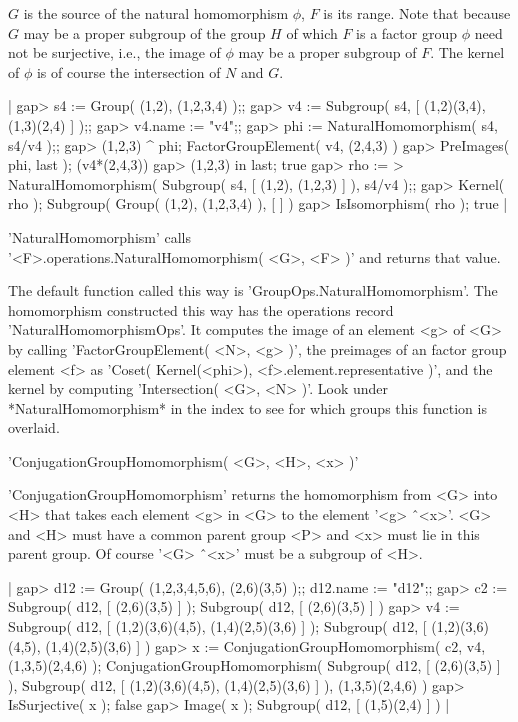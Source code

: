 $G$ is the source  of the natural  homomorphism $\phi$, $F$ is its range.
Note that because $G$ may be a proper subgroup  of the group $H$ of which
$F$ is a factor group $\phi$ need not  be  surjective, i.e., the image of
$\phi$ may be  a proper  subgroup of  $F$.  The  kernel  of $\phi$ is  of
course the intersection of $N$ and $G$.

|    gap> s4 := Group( (1,2), (1,2,3,4) );;
    gap> v4 := Subgroup( s4, [ (1,2)(3,4), (1,3)(2,4) ] );;
    gap> v4.name := "v4";;
    gap> phi := NaturalHomomorphism( s4, s4/v4 );;
    gap> (1,2,3) ^ phi;
    FactorGroupElement( v4, (2,4,3) )
    gap> PreImages( phi, last );
    (v4*(2,4,3))
    gap> (1,2,3) in last;
    true
    gap> rho :=
    >  NaturalHomomorphism( Subgroup( s4, [ (1,2), (1,2,3) ] ), s4/v4 );;
    gap> Kernel( rho );
    Subgroup( Group( (1,2), (1,2,3,4) ), [  ] )
    gap> IsIsomorphism( rho );
    true |

'NaturalHomomorphism' calls \\
'<F>.operations.NaturalHomomorphism( <G>, <F> )'
and returns that value.

The default function  called this  way is 'GroupOps.NaturalHomomorphism'.
The  homomorphism   constructed  this  way has the     operations  record
'NaturalHomomorphismOps'.  It computes the image of an element <g> of <G>
by calling 'FactorGroupElement( <N>,  <g> )', the preimages of  an factor
group element  <f>  as 'Coset(  Kernel(<phi>), <f>.element.representative
)', and the kernel by  computing 'Intersection( <G>,  <N> )'.  Look under
*NaturalHomomorphism* in the index to see for which groups this function
is overlaid.

%
%

'ConjugationGroupHomomorphism( <G>, <H>, <x> )'

'ConjugationGroupHomomorphism' returns the homomorphism from <G> into <H>
that takes each element <g> in <G> to the element '<g> \^\ <x>'.  <G> and
<H> must have a common parent  group <P> and <x> must lie in  this parent
group.  Of course '<G> \^\ <x>' must be a subgroup of <H>.

|    gap> d12 := Group( (1,2,3,4,5,6), (2,6)(3,5) );; d12.name := "d12";;
    gap> c2 := Subgroup( d12, [ (2,6)(3,5) ] );
    Subgroup( d12, [ (2,6)(3,5) ] )
    gap> v4 := Subgroup( d12, [ (1,2)(3,6)(4,5), (1,4)(2,5)(3,6) ] );
    Subgroup( d12, [ (1,2)(3,6)(4,5), (1,4)(2,5)(3,6) ] )
    gap> x := ConjugationGroupHomomorphism( c2, v4, (1,3,5)(2,4,6) );
    ConjugationGroupHomomorphism( Subgroup( d12, 
    [ (2,6)(3,5) ] ), Subgroup( d12, [ (1,2)(3,6)(4,5), (1,4)(2,5)(3,6) 
     ] ), (1,3,5)(2,4,6) )
    gap> IsSurjective( x );
    false
    gap> Image( x );
    Subgroup( d12, [ (1,5)(2,4) ] ) |

